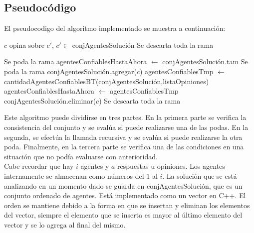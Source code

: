 \documentclass{article}
\begin{document}
\subsection{Pseudocódigo}

El pseudocodigo del algoritmo implementado se muestra a continuación:

\begin{algorithm}
\begin{algorithmic}[1]
 
	 
		 
			\State $c$ opina sobre $c'$, $c' \in$ conjAgentesSolución				\EndIf
		 
			\State Se descarta toda la rama
		\EndIf

			 
				 				
					 
						\State Se poda la rama 			
					\EndIf
				\EndIf
			\EndIf
	\EndFor
\EndFor
\State agentesConfiablesHastaAhora $\gets$ conjAgentesSolución.tam 
 
		\State Se poda la rama 
	\EndIf
	\State conjAgentesSolución.agregar($c$) 
	\State agentesConfiablesTmp $\gets$ cantidadAgentesConfiablesBT(conjAgentesSolución,listaOpiniones)
	 
		\State agentesConfiablesHastaAhora $\gets$ agentesConfiablesTmp 
	\EndIf
	\State conjAgentesSolución.eliminar($c$) 
\EndFor
{} 
	 
		\State Se descarta toda la rama
	\EndIf
\EndIf
\EndFunction
\end{algorithmic}
\end{algorithm}


Este algoritmo puede dividirse en tres partes. En la primera parte se verifica la consistencia del conjunto y se evalúa si puede realizarse una de las podas. En la segunda, se efectúa la llamada recursiva y se evalúa si puede realizarse la otra poda. Finalmente, en la tercera parte se verifica una de las condiciones en una situación que no podía evaluarse con anterioridad. \\
Cabe recordar que hay $i$ agentes y $a$ respuestas u opiniones. Los agentes internamente se almacenan como números del 1 al $i$. La solución que se está analizando en un momento dado se guarda en conjAgentesSolución, que es un conjunto ordenado de agentes. Está implementado como un vector en C++. El orden se mantiene debido a la forma en que se insertan y eliminan los elementos del vector, siempre el elemento que se inserta es mayor al último elemento del vector y se lo agrega al final del mismo.
\end{document}
